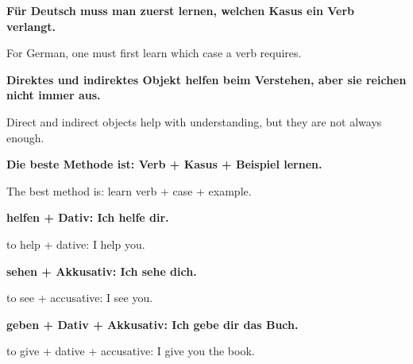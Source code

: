 \documentclass[a4paper]{article}
\newcommand{\EN}[1]{\par{\small\textcolor{TranslationGray}{#1}}\vspace{0.4em}}
\begin{document}
            \textbf{Für Deutsch muss man zuerst lernen, welchen Kasus ein Verb verlangt.}
            \EN{For German, one must first learn which case a verb requires.}
            
            \textbf{Direktes und indirektes Objekt helfen beim Verstehen, aber sie reichen nicht immer aus.}
            \EN{Direct and indirect objects help with understanding, but they are not always enough.}
            
            \textbf{Die beste Methode ist: Verb + Kasus + Beispiel lernen.}
            \EN{The best method is: learn verb + case + example.}
            
            \textbf{helfen + Dativ: Ich helfe dir.}
            \EN{to help + dative: I help you.}
            
            \textbf{sehen + Akkusativ: Ich sehe dich.}
            \EN{to see + accusative: I see you.}
            
            \textbf{geben + Dativ + Akkusativ: Ich gebe dir das Buch.}
            \EN{to give + dative + accusative: I give you the book.}
            
            \nocite{*}
%            
%            
\end{document}
